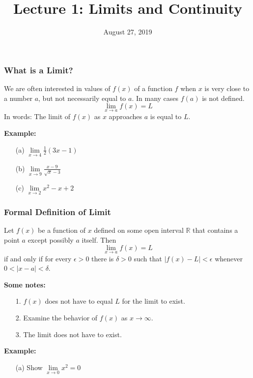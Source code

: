 \documentclass{beamer}
\title{\textbf{Lecture 1: Limits and Continuity}}
\date{August 27, 2019}
\begin{document}
	
\frame{\titlepage}

\begin{frame}
\frametitle{\textbf{What is a Limit?}}
We are often interested in values of $f(x)$ of a function $f$ when $x$ is very close to a number $a$, but not necessarily equal to $a$. In many cases $f(a)$ is not defined.
$$\lim\limits_{x \to a} f(x) = L$$
In words: The limit of $f(x)$ as $x$ approaches $a$ is equal to $L$.

\vspace{12pt}

\textbf{Example:}
\begin{itemize}
	\item[(a)] $\lim\limits_{x\to 4} \frac{1}{2}(3x-1)$
	\item[(b)] $\lim\limits_{x\to 9} \frac{x-9}{\sqrt{x}-3}$
	\item[(c)] $\lim\limits_{x\to 2} x^2-x+2$
\end{itemize}
\end{frame}

\begin{frame}
\frametitle{\textbf{Formal Definition of Limit}}
Let $f(x)$ be a function of $x$ defined on some open interval $\mathbb{R}$ that contains a point $a$ except possibly $a$ itself. Then
$$\lim\limits_{x \to a} f(x) = L$$ if and only if for every $\epsilon > 0$ there is $\delta > 0$ such that $|f(x) - L| < \epsilon$ whenever $0 < |x-a| < \delta$.

\vspace{6pt}

\textbf{Some notes:}
\begin{itemize}
	\item[1.] $f(x)$ does not have to equal $L$ for the limit to exist.
	\item[2.] Examine the behavior of $f(x)$ as $x \to \infty$.
	\item[3.] The limit does not have to exist.
\end{itemize}

\vspace{6pt}

\textbf{Example:}
\begin{itemize}
	\item[(a)] Show $\lim\limits_{x \to 0} x^2=0$
\end{itemize}
\end{frame}
\end{document}
